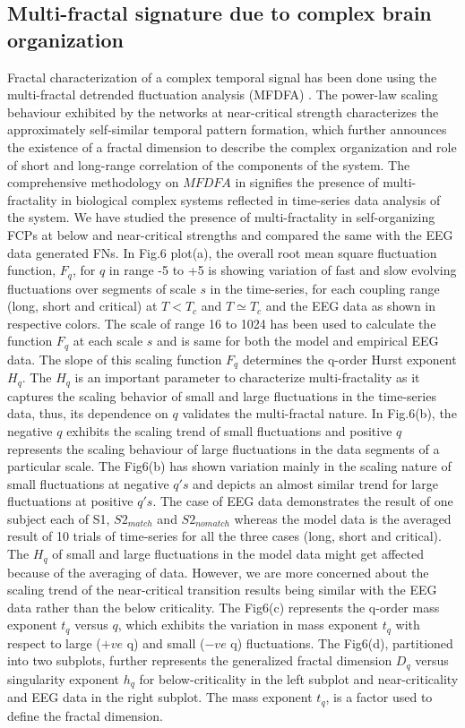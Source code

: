 \documentclass[preprintnumbers,amsmath,amssymb,onecolumn]{revtex4}
\begin{document}
\subsection{Multi-fractal signature due to complex brain organization}

{\noindent}Fractal characterization of a complex temporal signal has been done using the multi-fractal detrended fluctuation analysis (MFDFA) \citep{Kantelhardt2002, Song2005}. The power-law scaling behaviour exhibited by the networks at near-critical strength characterizes the approximately self-similar temporal pattern formation, which further announces the existence of a fractal dimension to describe the complex organization and role of short and long-range correlation of the components of the system. The comprehensive methodology on $MFDFA$ in \citep{Song2005, Ihlen2012} signifies the presence of multi-fractality in biological complex systems reflected in time-series data analysis of the system. We have studied the presence of multi-fractality in self-organizing FCPs at below and near-critical strengths and compared the same with the EEG data generated FNs.  In Fig.6 plot(a), the overall root mean square fluctuation function, $F_{q}$, for $q$ in range -5 to +5 is showing variation of fast and slow evolving fluctuations over segments of scale $s$ in the time-series, for each coupling range (long, short and critical) at $T<T_{c}$ and $T\simeq T_{c}$ and the EEG data as shown in respective colors. The scale of range 16 to 1024 has been used to calculate the function $F_{q}$ at each scale $s$ and is same for both the model and empirical EEG data. The slope of this scaling function $F_{q}$ determines the q-order Hurst exponent $H_{q}$. The $H_{q}$ is an important parameter to characterize multi-fractality as it captures the scaling behavior of small and large fluctuations in the time-series data, thus, its dependence on $q$ validates the multi-fractal nature. In Fig.6(b), the negative $q$ exhibits the scaling trend of small fluctuations and positive $q$ represents the scaling behaviour of large fluctuations in the data segments of a particular scale. The Fig6(b) has shown variation mainly in the scaling nature of small fluctuations at negative $q's$ and depicts an almost similar trend for large fluctuations at positive $q's$. The case of EEG data demonstrates the result of one subject each of S1, $S2_{match}$ and $S2_{nomatch}$ whereas the model data is the averaged result of 10 trials of time-series for all the three cases (long, short and critical). The $H_q$ of small and large fluctuations in the model data might get affected because of the averaging of data. However, we are more concerned about the scaling trend of the near-critical transition results being similar with the EEG data rather than the below criticality. The Fig6(c) represents the q-order mass exponent $t_{q}$ versus $q$, which exhibits the variation in mass exponent $t_q$ with respect to large ($+ve$ q) and small ($-ve$ q) fluctuations. The Fig6(d), partitioned into two subplots, further represents the generalized fractal dimension $D_q$ versus singularity exponent $h_q$ for below-criticality in the left subplot and near-criticality and EEG data in the right subplot. The mass exponent $t_{q}$, is a factor used to define the fractal dimension. 
\end{document}
